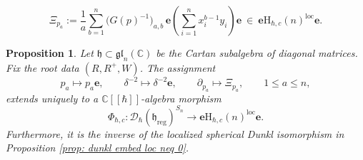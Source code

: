 \documentclass[10pt,a4paper]{amsart}
\newtheorem{proposition}{Proposition}
\newcommand{\bbC}{\mathbb{C}}
\newcommand{\be}{\mathbf{e}}
\newcommand{\fkh}{\mathfrak{h}}
\newcommand{\gl}{\mathfrak{gl}}
\newcommand{\loc}{{\mathrm{loc}}}
\newcommand{\mD}{\mathcal{D}}
\newcommand{\reg}{\mathrm{reg}}
\newcommand{\rmH}{\mathrm{H}}
\begin{document}
\begin{equation}\label{eq:power-sum-Cherednik-derivative}
	\Xi_{p_a}
	:=
	\frac1a\sum_{b=1}^n
	\bigl(G(p)^{-1}\bigr)_{a, b}\,
	\be\left(\sum_{i=1}^n x_i^{b-1}y_i\right)\be
	\ \in\
	\be\rmH_{\hbar,c}(n)^\loc\be.
\end{equation}

\begin{proposition}\label{prop: inverse dunkl power sum}
	Let \(\fkh \subset \gl_n (\bbC)\) be the Cartan subalgebra of diagonal matrices.
	Fix the root data \((R, R^+, W)\).
	The assignment
	\begin{equation}\label{for: inverse dunkl power sum}
		p_a\mapsto p_a\be,
		\qquad
		\delta^{-2}\mapsto\delta^{-2}\be,
		\qquad
		\partial_{p_a}\mapsto\Xi_{p_a},
		\qquad 1\leq a\leq n,
	\end{equation}
	extends uniquely to a \(\bbC[[\hbar]]\)-algebra morphism
	\[
	\Phi_{\hbar,c}:
	\mD_\hbar(\fkh_{\reg})^{S_n}
	\longrightarrow
	\be\rmH_{\hbar,c}(n)^\loc\be.
	\]
Furthermore, it is the inverse of the localized spherical Dunkl isomorphism in Proposition \ref{prop: dunkl embed loc neq 0}.
\end{proposition}
\end{document}
